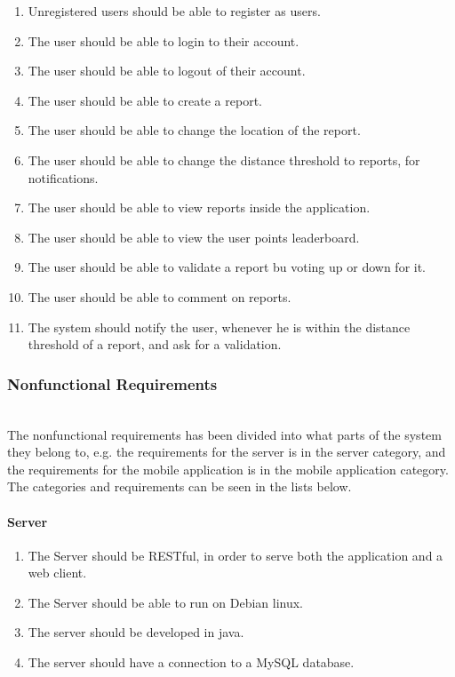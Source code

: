 \begin{enumerate}[label=F\arabic*]
\item Unregistered users should be able to register as users.
\item The user should be able to login to their account.
\item The user should be able to logout of their account.
\item The user should be able to create a report.
\item The user should be able to change the location of the report.
\item The user should be able to change the distance threshold to reports, for notifications.
\item The user should be able to view reports inside the application.
\item The user should be able to view the user points leaderboard.
\item The user should be able to validate a report bu voting up or down for it.
\item The user should be able to comment on reports.
\item The system should notify the user, whenever he is within the distance threshold of a report, and ask for a validation.
\end{enumerate}

\subsubsection{Nonfunctional Requirements}~\\
The nonfunctional requirements has been divided into what parts of the system they belong to, e.g. the requirements for the server is in the server category, and the requirements for the mobile application is in the mobile application category.
The categories and requirements can be seen in the lists below.

\paragraph{Server}
\begin{enumerate}[label=NS\arabic*]
\item The Server should be RESTful, in order to serve both the application and a web client.
\item The Server should be able to run on Debian linux.
\item The server should be developed in java.
\item The server should have a connection to a MySQL database.
\end{enumerate}

